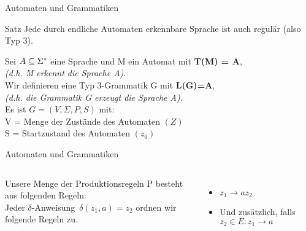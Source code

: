 \begin{frame}[fragile]{Automaten und Grammatiken}
    \begin{exampleblock}{Satz}
    Jede durch endliche Automaten erkennbare Sprache ist auch regulär (also Typ 3).
    \end{exampleblock}
   Sei \alert{$A \subseteq \Sigma^{*}$} eine Sprache und \alert{M ein Automat mit \textbf{T(M) = A}},\\ \emph{(d.h. M erkennt die Sprache A)}.\\
   \vspace{0.3cm}
   Wir definieren eine \alert{Typ 3-Grammatik G mit \textbf{L(G)=A}},\\ \emph{(d.h. die Grammatik G erzeugt die Sprache A)}.\\
   \vspace{0.3cm}
   Es ist $G=(V, \Sigma, P, S)$ mit:\\
   V = Menge der Zustände des Automaten $(Z)$\\
   S = Startzustand des Automaten $(z_0)$\\
    \vspace{0.3cm}
\end{frame}

\begin{frame}[fragile]{Automaten und Grammatiken}
    \begin{columns}
        Unsere Menge der Produktionsregeln P besteht aus folgenden Regeln:\\
        \vspace{0.3cm}
        Jeder \glqq$\delta$-Anweisung\grqq\ \alert{$\delta(z_1, a)=z_2$} ordnen wir folgende Regeln zu.
        \begin{itemize}
            \item \alert<2>{$z_1 \rightarrow a z_2$}
            \item Und zusätzlich, falls \alert<3>{$z_2 \in E: z_1 \rightarrow a$}
        \end{itemize}
        \centering
            
    \end{columns}
\end{frame}

